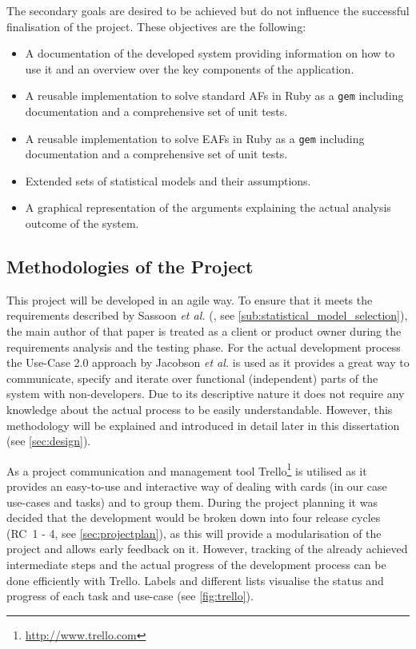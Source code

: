 \bigskip

The secondary goals are desired to be achieved but do not influence the successful finalisation of the project. These objectives are the following:

\begin{itemize}
	\item A documentation of the developed system providing information on how to use it and an overview over the key components of the application.
	\item A reusable implementation to solve standard \glspl{AF} in Ruby as a \texttt{gem} including documentation and a comprehensive set of unit tests.
	\item A reusable implementation to solve \glspl{EAF} in Ruby as a \texttt{gem} including documentation and a comprehensive set of unit tests.
	\item Extended sets of statistical models and their assumptions.
	\item A graphical representation of the arguments explaining the actual analysis outcome of the system.
\end{itemize}


\subsection{Methodologies of the Project}
\label{sub:methodologies}
This project will be developed in an agile way. To ensure that it meets the requirements described by Sassoon \textit{et al.} (\cite{sassoon2016,sassoon2014, sassoon2016CD}, see \autoref{sub:statistical_model_selection}), the main author of that paper is treated as a client or \gls{product owner} during the requirements analysis and the testing phase. For the actual development process the Use-Case 2.0 approach by Jacobson \textit{et al.} \cite{jacobson2011usecase} is used as it provides a great way to communicate, specify and iterate over functional (independent) parts of the system with non-developers. Due to its descriptive nature it does not require any knowledge about the actual process to be easily understandable. However, this methodology will be explained and introduced in detail later in this dissertation (see \autoref{sec:design}). 

As a project communication and management tool Trello\footnote{\url{http://www.trello.com}} is utilised as it provides an easy-to-use and interactive way of dealing with cards (in our case use-cases and tasks) and to group them. During the project planning it was decided that the development would be broken down into four release cycles (RC~1 - 4, see \autoref{sec:projectplan}), as this will provide a modularisation of the project and allows early feedback on it. However, tracking of the already achieved intermediate steps and the actual progress of the development process can be done efficiently with Trello. Labels and different lists visualise the status and progress of each task and use-case (see \autoref{fig:trello}).


